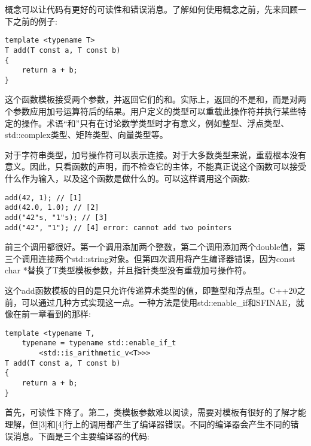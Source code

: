 概念可以让代码有更好的可读性和错误消息。了解如何使用概念之前，先来回顾一下之前的例子:

\begin{lstlisting}[style=styleCXX]
template <typename T>
T add(T const a, T const b)
{
	return a + b;
}
\end{lstlisting}

这个函数模板接受两个参数，并返回它们的和。实际上，返回的不是和，而是对两个参数应用加号运算符后的结果。用户定义的类型可以重载此操作符并执行某些特定的操作。术语“和”只有在讨论数学类型时才有意义，例如整型、浮点类型、std::complex类型、矩阵类型、向量类型等。

对于字符串类型，加号操作符可以表示连接。对于大多数类型来说，重载根本没有意义。因此，只看函数的声明，而不检查它的主体，不能真正说这个函数可以接受什么作为输入，以及这个函数是做什么的。可以这样调用这个函数:

\begin{lstlisting}[style=styleCXX]
add(42, 1); // [1]
add(42.0, 1.0); // [2]
add("42"s, "1"s); // [3]
add("42", "1"); // [4] error: cannot add two pointers
\end{lstlisting}

前三个调用都很好。第一个调用添加两个整数，第二个调用添加两个double值，第三个调用连接两个std::string对象。但第四次调用将产生编译器错误，因为const char *替换了T类型模板参数，并且指针类型没有重载加号操作符。

这个add函数模板的目的是只允许传递算术类型的值，即整型和浮点型。C++20之前，可以通过几种方式实现这一点。一种方法是使用std::enable\_if和SFINAE，就像在前一章看到的那样:

\begin{lstlisting}[style=styleCXX]
template <typename T,
	typename = typename std::enable_if_t
		<std::is_arithmetic_v<T>>>
T add(T const a, T const b)
{
	return a + b;
}
\end{lstlisting}

首先，可读性下降了。第二，类模板参数难以阅读，需要对模板有很好的了解才能理解，但[3]和[4]行上的调用都产生了编译器错误。不同的编译器会产生不同的错误消息。下面是三个主要编译器的代码:

